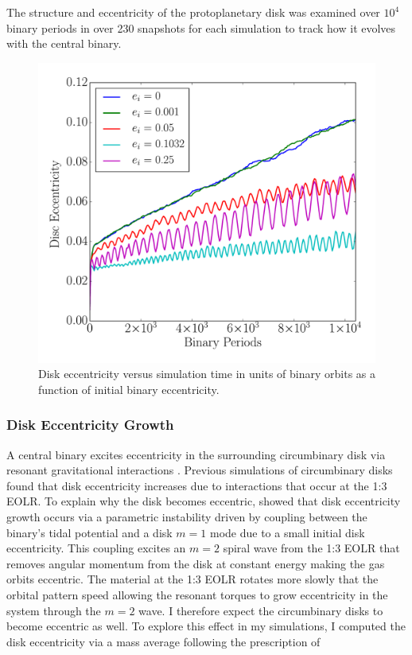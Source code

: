 The structure and eccentricity of the protoplanetary disk was examined over $10^4$ binary periods in over 230 snapshots
for each simulation to track how it evolves with the central binary.

\begin{figure}
	\includegraphics[width=\columnwidth]{f2}
    \caption{Disk eccentricity versus simulation time in units of binary orbits as a function of initial binary eccentricity.}
    \label{fig:CBDiskDiskEcc}
\end{figure}


\subsubsection{Disk Eccentricity Growth} \label{CBDisk:sec:discEccEvolution}

A central binary excites eccentricity in the surrounding
circumbinary disk via resonant gravitational interactions
\citep{Papaloizou2001,Artymowicz1996a}.  Previous simulations of circumbinary
disks \citep{Kley2008,Papaloizou2001,Pierens2007,Pierens2013} found
that disk eccentricity increases due to interactions that occur at
the 1:3 EOLR.  To explain why the disk becomes eccentric, \citet{Papaloizou2001} showed that disk eccentricity growth occurs via a parametric instability driven by coupling between the binary's tidal potential and a disk $m = 1$ mode due to a small initial disk eccentricity.  This coupling excites an $m = 2$ spiral wave from the 1:3 EOLR that removes angular momentum from the disk at constant energy making the gas orbits eccentric.  The material at the 1:3 EOLR rotates more slowly that the orbital pattern speed allowing the resonant torques to grow eccentricity in the system through the $m = 2$ wave.  I therefore expect the circumbinary disks to become eccentric as well.  To explore this effect in my simulations, I computed the disk eccentricity via a mass average following the prescription of \citet{Pierens2007}

